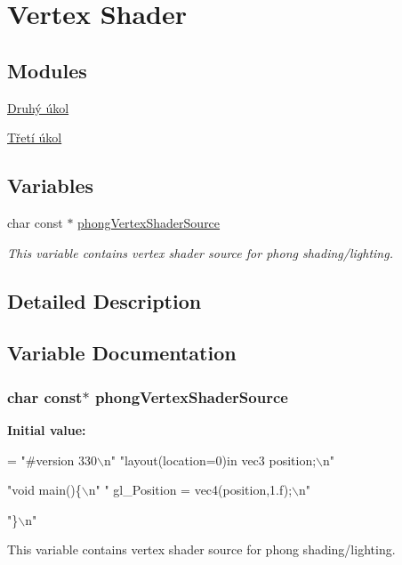 \hypertarget{group__vs}{}\section{Vertex Shader}
\label{group__vs}
\subsection*{Modules}
\begin{DoxyCompactItemize}
\item 
\hyperlink{group__task2}{Druhý úkol}
\item 
\hyperlink{group__task3}{Třetí úkol}
\end{DoxyCompactItemize}
\subsection*{Variables}
\begin{DoxyCompactItemize}
\item 
char const $\ast$ \hyperlink{group__vs_gad2d377f5d5db8945bf16b9e9ca1b71a5}{phong\+Vertex\+Shader\+Source}
\begin{DoxyCompactList}\small\item\em This variable contains vertex shader source for phong shading/lighting. \end{DoxyCompactList}\end{DoxyCompactItemize}


\subsection{Detailed Description}


\subsection{Variable Documentation}
\hypertarget{group__vs_gad2d377f5d5db8945bf16b9e9ca1b71a5}{}
\subsubsection[{phong\+Vertex\+Shader\+Source}]{\setlength{\rightskip}{0pt plus 5cm}char const$\ast$ phong\+Vertex\+Shader\+Source}\label{group__vs_gad2d377f5d5db8945bf16b9e9ca1b71a5}
{\bfseries Initial value\+:}
\begin{DoxyCode}
= 
\textcolor{stringliteral}{"#version 330\(\backslash\)n"}
\textcolor{stringliteral}{"layout(location=0)in vec3 position;\(\backslash\)n"}



\textcolor{stringliteral}{"void main()\{\(\backslash\)n"}
\textcolor{stringliteral}{"  gl\_Position = vec4(position,1.f);\(\backslash\)n"}



\textcolor{stringliteral}{"\}\(\backslash\)n"}
\end{DoxyCode}


This variable contains vertex shader source for phong shading/lighting. 

